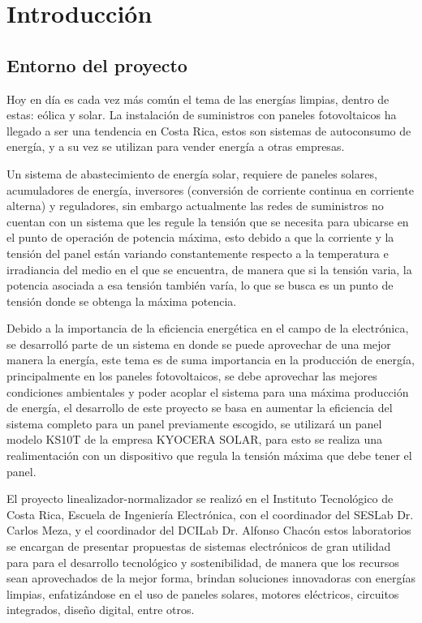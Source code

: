 
\chapter{Introducción}
\label{chp:intro}
\section{Entorno del proyecto}

Hoy en día es cada vez más común el tema de las energías limpias, dentro de estas: eólica y solar. La instalación de suministros con paneles fotovoltaicos ha llegado a ser una tendencia en Costa Rica, estos son sistemas de autoconsumo de energía, y a su vez se utilizan para vender energía a otras empresas. 

Un sistema de abastecimiento de energía solar, requiere de paneles solares, acumuladores de energía, inversores (conversión de corriente continua en corriente alterna) y reguladores, sin embargo actualmente las redes de suministros no cuentan con un sistema que les regule la tensión que se necesita para ubicarse en el punto de operación de potencia máxima, esto debido a que la corriente y la tensión del panel están variando constantemente respecto a la temperatura e irradiancia del medio en el que se encuentra, de manera que si la tensión varia, la potencia asociada a esa tensión también varía, lo que se busca es un punto de tensión donde se obtenga la máxima potencia.
 
Debido a la importancia de la eficiencia energética en el campo de la electrónica, se desarrolló parte de un sistema en donde se puede aprovechar de una mejor manera la energía, este tema es de suma importancia en la producción de energía, principalmente en los paneles fotovoltaicos, se debe aprovechar las mejores condiciones ambientales y poder acoplar el sistema para una máxima producción de energía, el desarrollo de este proyecto se basa en aumentar la eficiencia del sistema completo para un panel previamente escogido, se utilizará un panel modelo KS10T de la empresa KYOCERA SOLAR, para esto se realiza una realimentación con un dispositivo que regula la tensión máxima que debe tener el panel. 

El proyecto linealizador-normalizador se realizó en el Instituto Tecnológico de Costa Rica, Escuela de Ingeniería Electrónica, con el coordinador del SESLab Dr. Carlos Meza, y el coordinador del DCILab Dr. Alfonso Chacón estos laboratorios se encargan de presentar propuestas de sistemas electrónicos de gran utilidad para  para el desarrollo tecnológico y sostenibilidad, de manera que los recursos sean aprovechados de la mejor forma, brindan soluciones innovadoras con energías limpias, enfatizándose en el uso de paneles solares, motores eléctricos, circuitos integrados, diseño digital, entre otros. 

